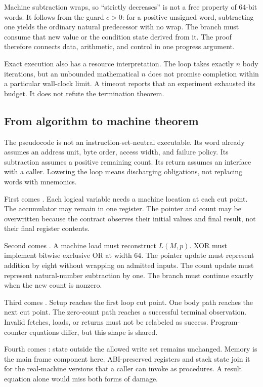 Machine subtraction wraps, so ``strictly decreases'' is not a free property of
64-bit words. It follows from the guard \(c>0\): for a positive unsigned word,
subtracting one yields the ordinary natural predecessor with no wrap. The
branch must consume that new value or the condition state derived from it.
The proof therefore connects data, arithmetic, and control in one progress
argument.

Exact execution also has a resource interpretation. The loop takes exactly
\(n\) body iterations, but an unbounded mathematical \(n\) does not promise
completion within a particular wall-clock limit. A timeout reports that an
experiment exhausted its budget. It does not refute the termination theorem.

\subsection{From algorithm to machine theorem}

The pseudocode is not an instruction-set-neutral executable. Its word
 already assumes an address unit, byte order, access width, and
failure policy. Its subtraction assumes a positive remaining count. Its return
assumes an interface with a caller. Lowering the loop means discharging
obligations, not replacing words with mnemonics.

First comes . Each logical variable needs a machine
location at each cut point. The accumulator may remain in one register. The
pointer and count may be overwritten because the contract observes their
initial values and final result, not their final register contents.

Second comes . A machine load must reconstruct
\(L(M,p)\). XOR must implement bitwise exclusive OR at width 64. The pointer
update must represent addition by eight without wrapping on admitted inputs.
The count update must represent natural-number subtraction by one. The branch
must continue exactly when the new count is nonzero.

Third comes . Setup reaches the first loop cut
point. One body path reaches the next cut point. The zero-count path reaches a
successful terminal observation. Invalid fetches, loads, or returns must not
be relabeled as success. Program-counter equations differ, but this shape is
shared.

Fourth comes : state outside the allowed write set
remains unchanged. Memory is the main frame component here. ABI-preserved
registers and stack state join it for the real-machine versions that a caller
can invoke as procedures. A
result equation alone would miss both forms of damage.

